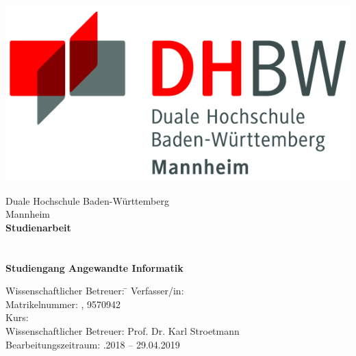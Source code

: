\begin{titlepage}
\begin{minipage}{\textwidth}
		\vspace{-2cm}
		\noindent \begin{center}
		\includegraphics{Bilder/logo.jpg}
	\end{center}		 
\end{minipage}
\vspace{1em}
\sffamily
\begin{center}
	\textsf{\large{}Duale Hochschule Baden-Württemberg\\[1.5mm] Mannheim}\\[2em]
	\textsf{\textbf{\large{}Studienarbeit}}\\[3mm]
	\textsf{\textbf{\Large{}\DerTitelDerArbeit}} \\[0.3cm]
	\textsf{\textbf{\large{}\DerUnterTitelDerArbeit}} \\[1.5cm]
	\textsf{\textbf{\large{}Studiengang Angewandte Informatik}}%
	
\vfill

\begin{minipage}{\textwidth}

\begin{tabbing}
	Wissenschaftlicher Betreuer: \hspace{0.85cm}\=\kill
	Verfasser/in: \> \DerAutorDerArbeit \\[1.5mm]
	Matrikelnummer: , 9570942 \\[1.5mm]
	Kurs: \> \DieKursbezeichnung \\[1.5mm]
	Wissenschaftlicher Betreuer: \> Prof. Dr. Karl Stroetmann  \\
	Bearbeitungszeitraum: .2018 -- 29.04.2019
\end{tabbing}
\end{minipage}

\end{center}

\end{titlepage}